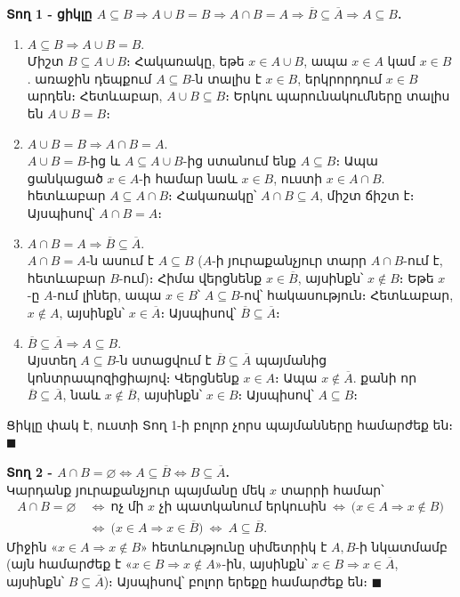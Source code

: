 \documentclass[11pt,a4paper]{article}
\begin{document}
\textbf{Տող 1 - ցիկլը
$A\subseteq B\Rightarrow A\cup B=B\Rightarrow A\cap B=A\Rightarrow \overline{B}\subseteq\overline{A}\Rightarrow A\subseteq B$.}

\begin{enumerate}[leftmargin=1.2cm]
\item[(ա)] $A\subseteq B\Rightarrow A\cup B=B$.\\
Միշտ $B\subseteq A\cup B$։ Հակառակը, եթե $x\in A\cup B$, ապա $x\in A$ կամ $x\in B$. առաջին դեպքում
$A\subseteq B$-ն տալիս է $x\in B$, երկրորդում $x\in B$ արդեն։ Հետևաբար, $A\cup B\subseteq B$։ Երկու
պարունակումները տալիս են $A\cup B=B$։
\item[(բ)] $A\cup B=B\Rightarrow A\cap B=A$.\\
$A\cup B=B$-ից և $A\subseteq A\cup B$-ից ստանում ենք $A\subseteq B$։ Ապա ցանկացած $x\in A$-ի համար նաև
$x\in B$, ուստի $x\in A\cap B$. հետևաբար $A\subseteq A\cap B$։ Հակառակը՝ $A\cap B\subseteq A$, միշտ
ճիշտ է։ Այսպիսով՝ $A\cap B=A$։
\item[(գ)] $A\cap B=A\Rightarrow \overline{B}\subseteq\overline{A}$.\\
$A\cap B=A$-ն ասում է $A\subseteq B$ ($A$-ի յուրաքանչյուր տարր $A\cap B$-ում է, հետևաբար $B$-ում)։ Հիմա
վերցնենք $x\in\overline{B}$, այսինքն՝ $x\notin B$։ Եթե $x$-ը $A$-ում լիներ, ապա $x\in B$՝ $A\subseteq B$-ով՝
հակասություն։ Հետևաբար, $x\notin A$, այսինքն՝ $x\in\overline{A}$։ Այսպիսով՝ $\overline{B}\subseteq\overline{A}$։
\item[(դ)] $\overline{B}\subseteq\overline{A}\Rightarrow A\subseteq B$.\\
Այստեղ $A\subseteq B$-ն ստացվում է $\overline{B}\subseteq\overline{A}$ պայմանից կոնտրապոզիցիայով։ Վերցնենք $x\in A$։ Ապա $x\notin\overline{A}$. քանի որ
$\overline{B}\subseteq\overline{A}$, նաև $x\notin\overline{B}$, այսինքն՝ $x\in B$։ Այսպիսով՝
$A\subseteq B$։
\end{enumerate}
Ցիկլը փակ է, ուստի Տող 1-ի բոլոր չորս պայմանները համարժեք են։ $\blacksquare$

\textbf{Տող 2 - $A\cap B=\varnothing\Leftrightarrow A\subseteq\overline{B}\Leftrightarrow B\subseteq\overline{A}$.}\\
Կարդանք յուրաքանչյուր պայմանը մեկ $x$ տարրի համար՝
$$\begin{aligned}
A\cap B=\varnothing
&\ \Longleftrightarrow\ \text{ոչ մի }x\text{ չի պատկանում երկուսին}
\ \Longleftrightarrow\ \bigl(x\in A\Rightarrow x\notin B\bigr)\\
&\ \Longleftrightarrow\ \bigl(x\in A\Rightarrow x\in\overline{B}\bigr)
\ \Longleftrightarrow\ A\subseteq\overline{B}.
\end{aligned}$$
Միջին «$x\in A\Rightarrow x\notin B$» հետևությունը սիմետրիկ է $A,B$-ի նկատմամբ (այն համարժեք է
«$x\in B\Rightarrow x\notin A$»-ին, այսինքն՝ $x\in B\Rightarrow x\in\overline{A}$, այսինքն՝
$B\subseteq\overline{A}$)։ Այսպիսով՝ բոլոր երեքը համարժեք են։ $\blacksquare$
\end{document}

